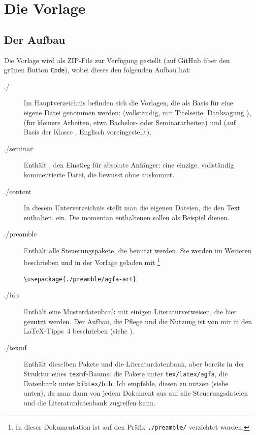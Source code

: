 \thispagestyle{empty}
\section{Die Vorlage}\label{sec:section1}
\subsection{Der Aufbau}\label{subsec:aufbau}
Die Vorlage wird als ZIP-File zur Verfügung gestellt (auf GitHub über den grünen Button \texttt{Code}), wobei dieses den folgenden Aufbau hat:
%
\begin{description}
\item[./] Im Hauptverzeichnis befinden sich die Vorlagen, die als Basis für eine eigene Datei genommen werden:
 (vollständig, mit Titelseite, Danksagung \etc), 
 (für kleinere Arbeiten, etwa Bachelor- oder Seminararbeiten) und
 (auf Basis der Klasse , Englisch voreingestellt).

\item[./seminar] Enthält , den Einstieg für absolute Anfänger: eine einzige, vollständig kommentierte Datei, die bewusst ohne  auskommt.

\item[./content] In diesem Unterverzeichnis stellt man die eigenen Dateien, die den Text enthalten, ein.
Die momentan enthaltenen sollen als Beispiel dienen.

\item[./preamble] Enthält alle Steuerungspakete, die benutzt werden. 
Sie werden im Weiteren beschrieben und in der Vorlage geladen mit%
\footnote{In dieser Dokumentation ist auf den Präfix \texttt{./preamble/} verzichtet worden.} 
\begin{center}
\verb|\usepackage{./preamble/agfa-art}|
\end{center}

\item[./bib] Enthält eine Musterdatenbank  mit einigen Literaturverweisen, die hier genutzt werden.
Der Aufbau, die Pflege und die Nutzung ist von mir in den \LaTeX-Tipps~4 beschrieben (siehe \cite{latextipps4}).

\item[./texmf]
Enthält dieselben Pakete und die Literaturdatenbank, aber bereits in der Struktur eines \texttt{texmf}-Baums: 
die Pakete unter \texttt{tex/latex/agfa}, die Datenbank unter \texttt{bibtex/bib}.
Ich empfehle, diesen zu nutzen (siehe unten), da man dann von jedem Dokument aus auf alle Steuerungsdateien und die Literaturdatenbank zugreifen kann.  

\end{description}
